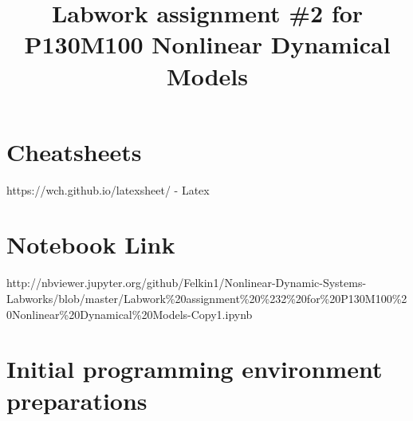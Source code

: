 \documentclass[11pt]{article}
\title{Labwork assignment \#2 for P130M100 Nonlinear Dynamical Models}
\begin{document}
    
    
    \maketitle
    
    

    
    \hypertarget{cheatsheets}{%
\section{Cheatsheets}\label{cheatsheets}}

https://wch.github.io/latexsheet/ - Latex

    \hypertarget{notebook-link}{%
\section{Notebook Link}\label{notebook-link}}

http://nbviewer.jupyter.org/github/Felkin1/Nonlinear-Dynamic-Systems-Labworks/blob/master/Labwork\%20assignment\%20\%232\%20for\%20P130M100\%20Nonlinear\%20Dynamical\%20Models-Copy1.ipynb

    \hypertarget{initial-programming-environment-preparations}{%
\section{Initial programming environment
preparations}\label{initial-programming-environment-preparations}}
\end{document}
